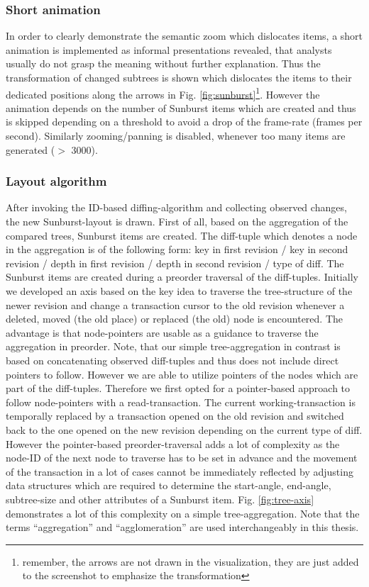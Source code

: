 \subsubsection{Short animation}
In order to clearly demonstrate the semantic zoom which dislocates items, a short animation is implemented as informal presentations revealed, that analysts usually do not grasp the meaning without further explanation. Thus the transformation of changed subtrees is shown which dislocates the items to their dedicated positions along the arrows in Fig. \ref{fig:sunburst}\footnote{remember, the arrows are not drawn in the visualization, they are just added to the screenshot to emphasize the transformation}. However the animation depends on the number of Sunburst items which are created and thus is skipped depending on a threshold to avoid a drop of the frame-rate (frames per second). Similarly zooming/panning is disabled, whenever too many items are generated ($>$ 3000).

\subsubsection{Layout algorithm}
After invoking the ID-based diffing-algorithm and collecting observed changes, the new Sunburst-layout is drawn. First of all, based on the aggregation of the compared trees, Sunburst items are created. The diff-tuple which denotes a node in the aggregation is of the following form: key in first revision / key in second revision / depth in first revision / depth in second revision / type of diff. The Sunburst items are created during a preorder traversal of the diff-tuples. Initially we developed an axis based on the key idea to traverse the tree-structure of the newer revision and change a transaction cursor to the old revision whenever a deleted, moved (the old place) or replaced (the old) node is encountered. The advantage is that node-pointers are usable as a guidance to traverse the aggregation in preorder. Note, that our simple tree-aggregation in contrast is based on concatenating observed diff-tuples and thus does not include direct pointers to follow. However we are able to utilize pointers of the nodes which are part of the diff-tuples. Therefore we first opted for a pointer-based approach to follow node-pointers with a read-transaction. The current working-transaction is temporally replaced by a transaction opened on the old revision and switched back to the one opened on the new revision depending on the current type of diff. However the pointer-based preorder-traversal adds a lot of complexity as the node-ID of the next node to traverse has to be set in advance and the movement of the transaction in a lot of cases cannot be immediately reflected by adjusting data structures which are required to determine the start-angle, end-angle, subtree-size and other attributes of a Sunburst item. Fig. \ref{fig:tree-axis} demonstrates a lot of this complexity on a simple tree-aggregation. Note that the terms ``aggregation'' and ``agglomeration'' are used interchangeably in this thesis. 

